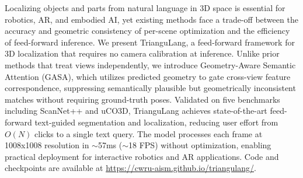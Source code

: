 Localizing objects and parts from natural language in 3D space is essential for robotics, AR, and embodied AI, yet existing methods face a trade-off between the accuracy and geometric consistency of per-scene optimization and the efficiency of feed-forward inference. We present TrianguLang, a feed-forward framework for 3D localization that requires no camera calibration at inference. Unlike prior methods that treat views independently, we introduce Geometry-Aware Semantic Attention (GASA), which utilizes predicted geometry to gate cross-view feature correspondence, suppressing semantically plausible but geometrically inconsistent matches without requiring ground-truth poses. Validated on five benchmarks including ScanNet++ and uCO3D, TrianguLang achieves state-of-the-art feed-forward text-guided segmentation and localization, reducing user effort from $O(N)$ clicks to a single text query. The model processes each frame at 1008x1008 resolution in $\sim$57ms ($\sim$18 FPS) without optimization, enabling practical deployment for interactive robotics and AR applications. Code and checkpoints are available at \url{https://cwru-aism.github.io/triangulang/}.


